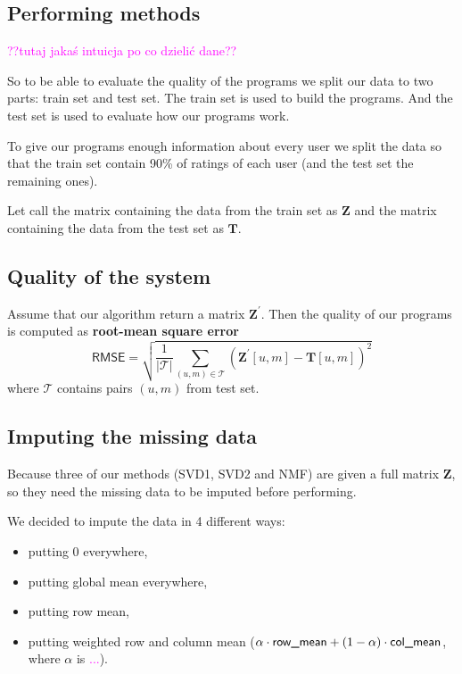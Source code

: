 \documentclass[11pt]{amsart}
\newcommand{\tami}[1]{{\textcolor{magenta}{#1}}}
\begin{document}
\subsection*{Performing methods}

\tami{??tutaj jakaś intuicja po co dzielić dane??}

So to be able to evaluate the quality of the programs we split our data to two parts: train set and test set.
The train set is used to build the programs.
And the test set is used to evaluate how our programs work.


To give our programs enough information about every user we split the data so that the train set contain 90\% of ratings of each user (and the test set the remaining ones).


Let call the matrix containing the data from the train set as $\boldsymbol{Z}$ and the matrix containing the data from the test set as $\boldsymbol{T}$.


\subsection*{Quality of the system}

Assume that our algorithm return a matrix $\boldsymbol{Z}^{'}$.
Then the quality of our programs is computed as \textbf{root-mean square error}
\[\textsf{RMSE} =
\sqrt{\frac{1}{|\mathcal{T}|} \sum_{(u,m) \in \mathcal{T}} \left(\boldsymbol{Z}^{'}[u,m] - \boldsymbol{T}[u,m] \right)^2}\]
where $\mathcal{T}$ contains pairs $(u,m)$ from test set.


\subsection*{Imputing the missing data}

Because three of our methods (SVD1, SVD2 and NMF) are given a full matrix $\boldsymbol{Z}$, so they need the missing data to be imputed before performing.

We decided to impute the data in 4 different ways:
\begin{itemize}
    \item putting 0 everywhere,
    \item putting global mean everywhere,
    \item putting row mean,
    \item putting weighted row and column mean ($\alpha \cdot \text{\textsf{row\_mean}} + (1-\alpha) \cdot \text{\textsf{col\_mean}}$, where $\alpha$ is \tami{...}).
\end{itemize}
\end{document}
